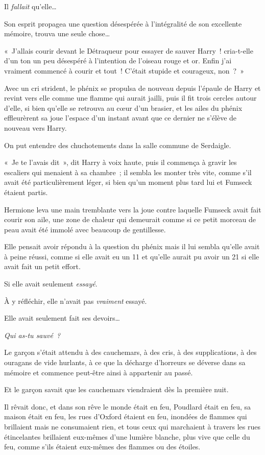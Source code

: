 Il \emph{fallait} qu'elle…

Son esprit propagea une question désespérée à l'intégralité de son excellente mémoire, trouva une seule chose…

«~J'allais courir devant le Détraqueur pour essayer de sauver Harry~! cria-t-elle d'un ton un peu désespéré à l'intention de l'oiseau rouge et or. Enfin j'ai vraiment commencé à courir et tout~! C'était stupide et courageux, non~?~»

Avec un cri strident, le phénix se propulsa de nouveau depuis l'épaule de Harry et revint vers elle comme une flamme qui aurait jailli, puis il fit trois cercles autour d'elle, si bien qu'elle se retrouva au cœur d'un brasier, et les ailes du phénix effleurèrent sa joue l'espace d'un instant avant que ce dernier ne s'élève de nouveau vers Harry.

On put entendre des chuchotements dans la salle commune de Serdaigle.

«~Je te l'avais dit~», dit Harry à voix haute, puis il commença à gravir les escaliers qui menaient à sa chambre~; il sembla les monter très vite, comme s'il avait été particulièrement léger, si bien qu'un moment plus tard lui et Fumseck étaient partis.

Hermione leva une main tremblante vers la joue contre laquelle Fumseck avait fait courir son aile, une zone de chaleur qui demeurait comme si ce petit morceau de peau avait été immolé avec beaucoup de gentillesse.

Elle pensait avoir répondu à la question du phénix mais il lui sembla qu'elle avait à peine réussi, comme si elle avait eu un 11 et qu'elle aurait pu avoir un 21 si elle avait fait un petit effort.

Si elle avait seulement \emph{essayé}.

À y réfléchir, elle n'avait pas \emph{vraiment} essayé.

Elle avait seulement fait ses devoirs…

\emph{Qui as-tu sauvé~?}


Le garçon s'était attendu à des cauchemars, à des cris, à des supplications, à des ouragans de vide hurlants, à ce que la décharge d'horreurs se déverse dans sa mémoire et commence peut-être ainsi à appartenir au passé.

Et le garçon savait que les cauchemars viendraient dès la première nuit.

Il rêvait donc, et dans son rêve le monde était en feu, Poudlard était en feu, sa maison était en feu, les rues d'Oxford étaient en feu, inondées de flammes qui brillaient mais ne consumaient rien, et tous ceux qui marchaient à travers les rues étincelantes brillaient eux-mêmes d'une lumière blanche, plus vive que celle du feu, comme s'ils étaient eux-mêmes des flammes ou des étoiles.

